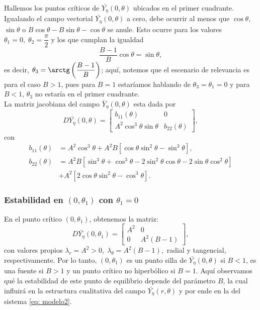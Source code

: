 \noindent Hallemos los puntos críticos de $\bar{Y_{\eta}}(0,\theta)$ ubicados en el primer cuadrante. Igualando el campo vectorial $\bar{Y_{\eta}}(0,\theta)$ a cero, debe ocurrir al menos que $\cos\theta$, $\sin\theta$ o $B\cos\theta-B\sin\theta-\cos\theta$ se anule. Esto ocurre para los valores $\theta_1 = 0, \; \theta_2 = \dfrac{\pi}{2}$ y los que cumplan la igualdad $$\dfrac{B-1}{B}\cos\theta=\sin\theta,$$ es decir, $\theta_3 = \arctg\left( \dfrac{B-1}{B} \right)$; aquí, notemos que el escenario de relevancia es para el caso $B>1$, pues para $B=1$ estaríamos hablando de $\theta_3 = \theta_1 = 0$ y para $B<1$, $\theta_3$ no estaría en el primer cuadrante. \\

\noindent La matriz jacobiana del campo $\bar{Y}_{\eta}(0,\theta)$ esta dada por
\begin{equation*}
	D\bar{Y_{\eta}}(0,\theta) =
	\begin{bmatrix}
		b_{11}(\theta)  & 0\\
		A^{2}\cos^{3}\theta\sin\theta & b_{22}(\theta)
	\end{bmatrix},
	\label{eq:jacobianaModelo2Polar}
\end{equation*}
con
\begin{equation*}
	\begin{aligned}
		b_{11}(\theta) &= A^{2}\cos^{3}\theta + A^{2}B[\cos\theta\sin^{2}\theta - \sin^{3}\theta], \\
		b_{22}(\theta) &= A^{2}B[\sin^{3}\theta + \cos^{3}\theta - 2\sin^{2}\theta\cos\theta - 2\sin\theta\cos^{2}\theta] \\
		&+ A^{2}[2\cos\theta\sin^{2}\theta - \cos^{3}\theta].
	\end{aligned}
\end{equation*}

\subsubsection*{Estabilidad en $(0, \theta_1)$ con $\theta_1=0$}
En el punto crítico $(0,\theta_1)$, obtenemos la matriz:
\begin{equation*}
	D\bar{Y_{\eta}}(0,\theta_1) =
	\begin{bmatrix}
		A^{2}  & 0 \\
		0 & A^{2}(B-1)
	\end{bmatrix},
	\label{eq:jacobianaModelo2PolarEn(0,0)}
\end{equation*}
con valores propios $\lambda_r = A^{2}>0, \; \lambda_\theta = A^{2}(B-1),$ radial y tangencial, respectivamente. Por lo tanto, $(0, \theta_1)$ es un punto silla de $\bar{Y_{\eta}}(0,\theta)$ si \linebreak $B<1$, es una fuente si $B>1$ y un punto crítico no hiperbólico si $B=1$. Aquí observamos qué la estabilidad de este punto de equilibrio depende del parámetro $B$, la cual influirá en la estructura cualitativa del campo $\bar{Y_{\eta}}(r,\theta)$ y por ende en la del sistema \eqref{eq: modelo2}. \\ %

